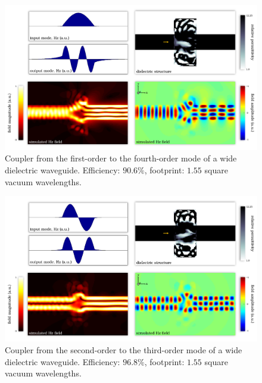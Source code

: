 \begin{figure}[h!]
    \centering
    \includegraphics[width=\textwidth]{p3/8}
    \caption{
        Coupler from the first-order to the fourth-order mode 
            of a wide dielectric waveguide.
        Efficiency: $90.6\%$,
        footprint: $1.55$ square vacuum wavelengths.
        }
\end{figure}
\begin{figure}[h!]
    \centering
    \includegraphics[width=\textwidth]{p3/9}
    \caption{
        Coupler from the second-order to the third-order mode 
            of a wide dielectric waveguide.
        Efficiency: $96.8\%$,
        footprint: $1.55$ square vacuum wavelengths.
        }
\end{figure}
